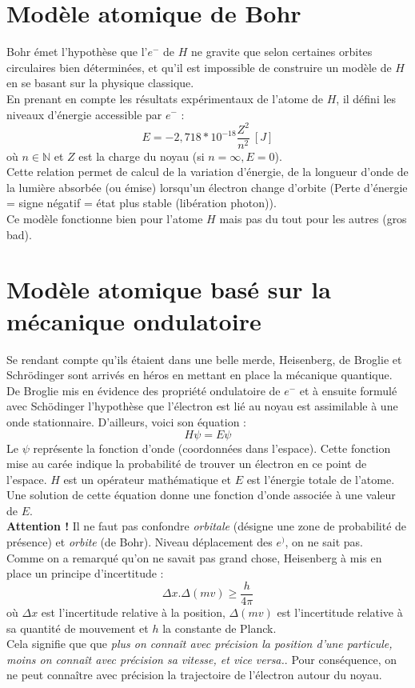 \documentclass	[11pt, a4paper, openany]{book}
\begin{document}
\section{Modèle atomique de Bohr}
Bohr émet l'hypothèse que l'$e^-$ de $H$ ne gravite que selon certaines orbites circulaires bien déterminées, et qu'il est impossible de construire un modèle de $H$ en se basant sur la physique classique.\\
En prenant en compte les résultats expérimentaux de l'atome de $H$, il défini les niveaux d'énergie accessible par $e^-$ :
$$E = -2,718*10^{-18} \frac{Z^2}{n^2}\ [J]$$
où $n \in \mathbb{N}$ et $Z$ est la charge du noyau (si $n = \infty, E = 0$).\\
Cette relation permet de calcul de la variation d'énergie, de la longueur d'onde de la lumière absorbée (ou émise) lorsqu'un électron change d'orbite (Perte d'énergie = signe négatif = état plus stable (libération photon)).\\

Ce modèle fonctionne bien pour l'atome $H$ mais pas du tout pour les autres (gros bad).

\section{Modèle atomique basé sur la mécanique ondulatoire}
Se rendant compte qu'ils étaient dans une belle merde, Heisenberg, de Broglie et Schrödinger sont arrivés en héros en mettant en place la mécanique quantique.\\

De Broglie mis en évidence des propriété ondulatoire de $e^-$ et à ensuite formulé avec Schödinger l'hypothèse que l'électron est lié au noyau est assimilable à une onde stationnaire. D'ailleurs, voici son équation  :
$$H\psi = E\psi$$
Le $\psi$ représente la fonction d'onde (coordonnées dans l'espace). Cette fonction mise au carée indique la probabilité de trouver un électron en ce point de l'espace. $H$ est un opérateur mathématique et $E$ est l'énergie totale de l'atome.\\
Une solution de cette équation donne une fonction d'onde associée à une valeur de $E$.\\

\textbf{Attention ! } Il ne faut pas confondre \textit{orbitale} (désigne une zone de probabilité de présence) et \textit{orbite} (de Bohr). Niveau déplacement des $e^)$, on ne sait pas.\\

Comme on a remarqué qu'on ne savait pas grand chose, Heisenberg à mis en place un principe d'incertitude :
$$\Delta x . \Delta (mv) \geq \frac{h}{4\pi}$$
où $\Delta x$ est l'incertitude relative à la position, $\Delta (mv)$ est l'incertitude relative à sa quantité de mouvement et $h$ la constante de Planck.\\
Cela signifie que que \textit{plus on connaît avec précision la position d'une particule, moins on connaît avec précision sa vitesse, et vice versa.}. Pour conséquence, on ne peut connaître avec précision la trajectoire de l'électron autour du noyau.\\
\end{document}
